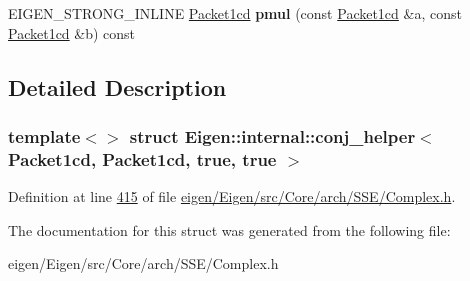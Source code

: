 \begin{DoxyCompactItemize}
\item 
\mbox{\label{struct_eigen_1_1internal_1_1conj__helper_3_01_packet1cd_00_01_packet1cd_00_01true_00_01true_01_4_a4ef4207a9fe37dbfb82d1f059c27b1b3}} 
E\+I\+G\+E\+N\+\_\+\+S\+T\+R\+O\+N\+G\+\_\+\+I\+N\+L\+I\+NE \hyperlink{struct_eigen_1_1internal_1_1_packet1cd}{Packet1cd} {\bfseries pmul} (const \hyperlink{struct_eigen_1_1internal_1_1_packet1cd}{Packet1cd} \&a, const \hyperlink{struct_eigen_1_1internal_1_1_packet1cd}{Packet1cd} \&b) const
\end{DoxyCompactItemize}


\subsection{Detailed Description}
\subsubsection*{template$<$$>$\newline
struct Eigen\+::internal\+::conj\+\_\+helper$<$ Packet1cd, Packet1cd, true, true $>$}



Definition at line \hyperlink{eigen_2_eigen_2src_2_core_2arch_2_s_s_e_2_complex_8h_source_l00415}{415} of file \hyperlink{eigen_2_eigen_2src_2_core_2arch_2_s_s_e_2_complex_8h_source}{eigen/\+Eigen/src/\+Core/arch/\+S\+S\+E/\+Complex.\+h}.



The documentation for this struct was generated from the following file\+:\begin{DoxyCompactItemize}
\item 
eigen/\+Eigen/src/\+Core/arch/\+S\+S\+E/\+Complex.\+h\end{DoxyCompactItemize}

